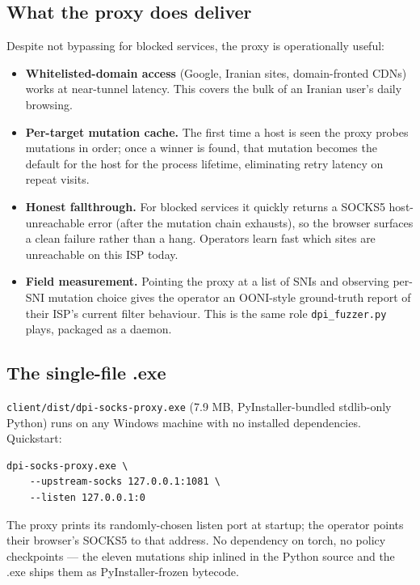 \documentclass[letterpaper,twocolumn,10pt]{article}
\begin{document}
\subsection{What the proxy does deliver}

Despite not bypassing for blocked services, the proxy is operationally
useful:

\begin{itemize}
    \item \textbf{Whitelisted-domain access} (Google, Iranian sites,
    domain-fronted CDNs) works at near-tunnel latency. This covers
    the bulk of an Iranian user's daily browsing.
    \item \textbf{Per-target mutation cache.} The first time a host is
    seen the proxy probes mutations in order; once a winner is
    found, that mutation becomes the default for the host for the
    process lifetime, eliminating retry latency on repeat visits.
    \item \textbf{Honest fallthrough.} For blocked services it
    quickly returns a SOCKS5 host-unreachable error (after the
    mutation chain exhausts), so the browser surfaces a clean
    failure rather than a hang. Operators learn fast which sites
    are unreachable on this ISP today.
    \item \textbf{Field measurement.} Pointing the proxy at a list
    of SNIs and observing per-SNI mutation choice gives the
    operator an OONI-style ground-truth report of their ISP's
    current filter behaviour. This is the same role
    \texttt{dpi\_fuzzer.py} plays, packaged as a daemon.
\end{itemize}

\subsection{The single-file .exe}

\texttt{client/dist/dpi-socks-proxy.exe} (7.9 MB,
PyInstaller-bundled stdlib-only Python) runs on any Windows machine
with no installed dependencies. Quickstart:

{\small\begin{verbatim}
dpi-socks-proxy.exe \
    --upstream-socks 127.0.0.1:1081 \
    --listen 127.0.0.1:0
\end{verbatim}}

The proxy prints its randomly-chosen listen port at startup; the
operator points their browser's SOCKS5 to that address. No
dependency on torch, no policy checkpoints — the eleven mutations
ship inlined in the Python source and the .exe ships them as
PyInstaller-frozen bytecode.
\end{document}
